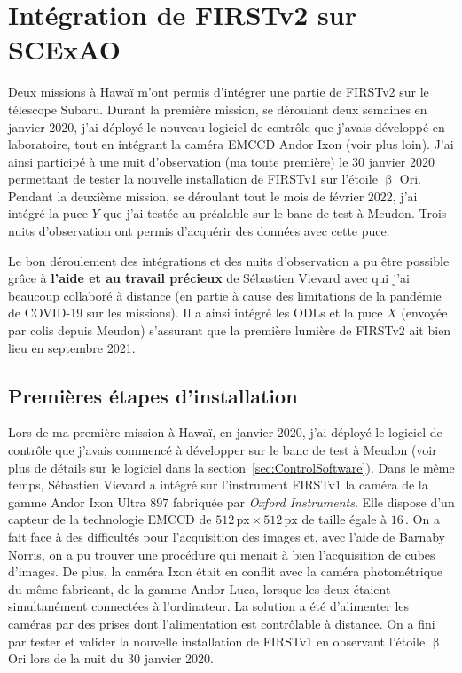 \section{Intégration de FIRSTv2 sur SCExAO}

Deux missions à Hawaï m'ont permis d'intégrer une partie de \ac{FIRSTv2} sur le télescope Subaru. Durant la première mission, se déroulant deux semaines en janvier 2020, j'ai déployé le nouveau logiciel de contrôle que j'avais développé en laboratoire, tout en intégrant la caméra \ac{EMCCD} Andor Ixon (voir plus loin). J'ai ainsi participé à une nuit d'observation (ma toute première) le 30 janvier 2020 permettant de tester la nouvelle installation de \ac{FIRSTv1} sur l'étoile $\upbeta$ Ori. Pendant la deuxième mission, se déroulant tout le mois de février 2022, j'ai intégré la puce $Y$ que j'ai testée au préalable sur le banc de test à Meudon. Trois nuits d'observation ont permis d'acquérir des données avec cette puce.

Le bon déroulement des intégrations et des nuits d'observation a pu être possible grâce à \textbf{l'aide et au travail précieux} de Sébastien Vievard avec qui j'ai beaucoup collaboré à distance (en partie à cause des limitations de la pandémie de COVID-19 sur les missions). Il a ainsi intégré les \acrshort{ODL}s et la puce $X$ (envoyée par colis depuis Meudon) s'assurant que la première lumière de \ac{FIRSTv2} ait bien lieu en septembre 2021.


\subsection{Premières étapes d'installation}
\label{sec:V1V2Integration}

Lors de ma première mission à Hawaï, en janvier 2020, j'ai déployé le logiciel de contrôle que j'avais commencé à développer sur le banc de test à Meudon (voir plus de détails sur le logiciel dans la section~\ref{sec:ControlSoftware}). Dans le même temps, Sébastien Vievard a intégré sur l'instrument \ac{FIRSTv1} la caméra de la gamme Andor Ixon Ultra $897$ fabriquée par \textit{Oxford Instruments}. Elle dispose d'un capteur de la technologie \acrfull{EMCCD} de $512 \,\text{px} \times 512\,\text{px}$ de taille égale à $16 \,$\um. On a fait face à des difficultés pour l'acquisition des images et, avec l'aide de Barnaby Norris, on a pu trouver une procédure qui menait à bien l'acquisition de cubes d'images. De plus, la caméra Ixon était en conflit avec la caméra photométrique du même fabricant, de la gamme Andor Luca, lorsque les deux étaient simultanément connectées à l'ordinateur. La solution a été d'alimenter les caméras par des prises dont l'alimentation est contrôlable à distance. On a fini par tester et valider la nouvelle installation de \ac{FIRSTv1} en observant l'étoile $\upbeta$ Ori lors de la nuit du 30 janvier 2020.

